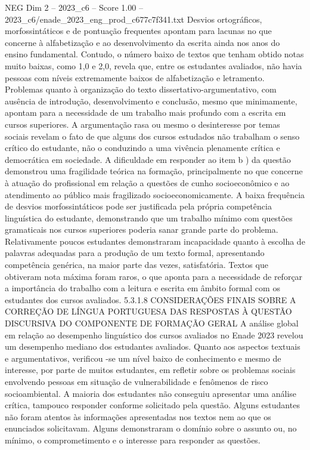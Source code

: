\begin{textsample}{NEG Dim 2 – 2023\_c6 – Score 1.00 – 2023\_c6/enade\_2023\_eng\_prod\_c677c7f341.txt}
Desvios ortográficos, morfossintáticos e de pontuação frequentes apontam para lacunas no que concerne à alfabetização e ao desenvolvimento da escrita ainda nos anos do ensino fundamental.
Contudo, o número baixo de textos que tenham obtido notas muito baixas, como 1,0 e 2,0, revela que, entre os estudantes avaliados, não havia pessoas com níveis extremamente baixos de alfabetização e letramento.
Problemas quanto à organização do texto dissertativo-argumentativo, com ausência de introdução, desenvolvimento e conclusão, mesmo que minimamente, apontam para a necessidade de um trabalho mais profundo com a escrita em cursos superiores.
A argumentação rasa ou mesmo o desinteresse por temas sociais revelam o fato de que alguns dos cursos estudados não trabalham o senso crítico do estudante, não o conduzindo a uma vivência plenamente crítica e democrática em sociedade.
A dificuldade em responder ao item b ) da questão demonstrou uma fragilidade teórica na formação, principalmente no que concerne à atuação do profissional em relação a questões de cunho socioeconômico e ao atendimento ao público mais fragilizado socioeconomicamente.
A baixa frequência de desvios morfossintáticos pode ser justificada pela própria competência linguística do estudante, demonstrando que um trabalho mínimo com questões gramaticais nos cursos superiores poderia sanar grande parte do problema.
Relativamente poucos estudantes demonstraram incapacidade quanto à escolha de palavras adequadas para a produção de um texto formal, apresentando competência genérica, na maior parte das vezes, satisfatória.
Textos que obtiveram nota máxima foram raros, o que aponta para a necessidade de reforçar a importância do trabalho com a leitura e escrita em âmbito formal com os estudantes dos cursos avaliados. 5.3.1.8 CONSIDERAÇÕES FINAIS SOBRE A CORREÇÃO DE LÍNGUA PORTUGUESA DAS RESPOSTAS À QUESTÃO DISCURSIVA DO COMPONENTE DE FORMAÇÃO GERAL A análise global em relação ao desempenho linguístico dos cursos avaliados no Enade 2023 revelou um desempenho mediano dos estudantes avaliados.
Quanto aos aspectos textuais e argumentativos, verificou -se um nível baixo de conhecimento e mesmo de interesse, por parte de muitos estudantes, em refletir sobre os problemas sociais envolvendo pessoas em situação de vulnerabilidade e fenômenos de risco socioambiental.
A maioria dos estudantes não conseguiu apresentar uma análise crítica, tampouco responder conforme solicitado pela questão.
Alguns estudantes não foram atentos às informações apresentadas nos textos nem ao que os enunciados solicitavam.
Alguns demonstraram o domínio sobre o assunto ou, no mínimo, o comprometimento e o interesse para responder as questões.

\end{textsample}
